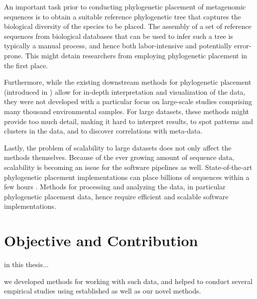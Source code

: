 An important task prior to conducting phylogenetic placement of metagenomic sequences is to obtain a suitable
reference phylogenetic tree that captures the biological diversity of the species to be placed.
The assembly of a set of reference sequences from biological databases that can be used to infer such a tree
is typically a manual process, and hence both labor-intensive and potentially error-prone.
This might detain researchers from employing phylogenetic placement in the first place.

Furthermore, while the existing downstream methods for phylogenetic placement
(introduced in )
allow for in-depth interpretation and visualization of the data,
they were not developed with a particular focus on large-scale studies comprising many thousand environmental samples.
For large datasets, these methods might provide too much detail,
making it hard to interpret results, to spot patterns and clusters in the data,
and to discover correlations with meta-data.

Lastly, the problem of scalability to large datasets does not only affect the methods themselves.
Because of the ever growing amount of sequence data,
scalability is becoming an issue for the software pipelines as well.
State-of-the-art phylogenetic placement implementations can place billions of sequences within a few hours \cite{Barbera2018}.
Methods for processing and analyzing the data, in particular phylogenetic placement data,
hence require efficient and scalable software implementations.


\section{Objective and Contribution}
\label{ch:Introduction:sec:ObjectiveContribution}

in this thesis...




we developed methods for working with such data, and helped to conduct several empirical studies using established as well as our novel methods.

